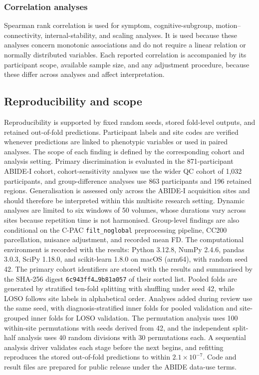 \subsubsection{Correlation analyses}
\label{subsubsec:correlation-analyses}

Spearman rank correlation is used for symptom, cognitive-subgroup, motion--connectivity, internal-stability, and scaling analyses. It is used because these analyses concern monotonic associations and do not require a linear relation or normally distributed variables. Each reported correlation is accompanied by its participant scope, available sample size, and any adjustment procedure, because these differ across analyses and affect interpretation.


\subsection{Reproducibility and scope}
\label{subsec:reproducibility-scope}

Reproducibility is supported by fixed random seeds, stored fold-level outputs, and retained out-of-fold predictions. Participant labels and site codes are verified whenever predictions are linked to phenotypic variables or used in paired analyses. The scope of each finding is defined by the corresponding cohort and analysis setting. Primary discrimination is evaluated in the 871-participant ABIDE-I cohort, cohort-sensitivity analyses use the wider QC cohort of 1,032 participants, and group-difference analyses use 863 participants and 196 retained regions. Generalisation is assessed only across the ABIDE-I acquisition sites and should therefore be interpreted within this multisite research setting. Dynamic analyses are limited to six windows of 50 volumes, whose durations vary across sites because repetition time is not harmonised. Group-level findings are also conditional on the C-PAC \texttt{filt\_noglobal} preprocessing pipeline, CC200 parcellation, nuisance adjustment, and recorded mean FD. The computational environment is recorded with the results: Python 3.12.8, NumPy 2.4.6, pandas 3.0.3, SciPy 1.18.0, and scikit-learn 1.8.0 on macOS (arm64), with random seed 42. The primary cohort identifiers are stored with the results and summarised by the SHA-256 digest \texttt{6c943ff4\ldots9b81a057} of their sorted list. Pooled folds are generated by stratified ten-fold splitting with shuffling under seed 42, while LOSO follows site labels in alphabetical order. Analyses added during review use the same seed, with diagnosis-stratified inner folds for pooled validation and site-grouped inner folds for LOSO validation. The permutation analysis uses 100 within-site permutations with seeds derived from 42, and the independent split-half analysis uses 40 random divisions with 30 permutations each. A sequential analysis driver validates each stage before the next begins, and refitting reproduces the stored out-of-fold predictions to within $2.1\times10^{-7}$. Code and result files are prepared for public release under the ABIDE data-use terms.
